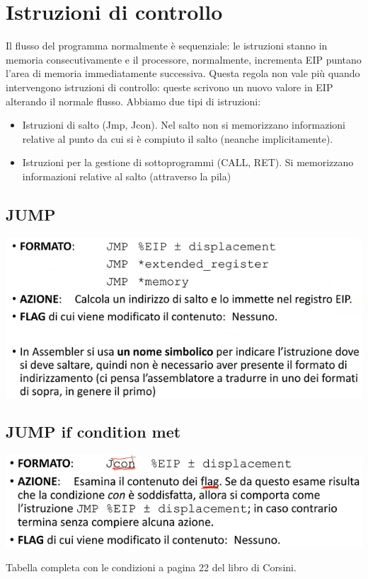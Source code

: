 \documentclass[11pt]{report}
\begin{document}
\section{Istruzioni di controllo}
Il flusso del programma normalmente è sequenziale: le istruzioni stanno in memoria consecutivamente e il processore, normalmente, incrementa EIP puntano l'area di memoria immediatamente successiva. Questa regola non vale più quando intervengono istruzioni di controllo: queste scrivono un nuovo valore in EIP alterando il normale flusso. Abbiamo due tipi di istruzioni:
\begin{itemize}
\item Istruzioni di salto (Jmp, Jcon). Nel salto non si memorizzano informazioni relative al punto da cui si è compiuto il salto (neanche implicitamente).
\item Istruzioni per la gestione di sottoprogrammi (CALL, RET). Si memorizzano informazioni relative al salto (attraverso la pila)
\end{itemize}

\subsection{JUMP}
\begin{center}
\includegraphics{img/36.PNG}
\end{center}

\subsection{JUMP if condition met}
\begin{center}
\includegraphics{img/37.PNG}
\end{center}
Tabella completa con le condizioni a pagina 22 del libro di Corsini.
\end{document}
